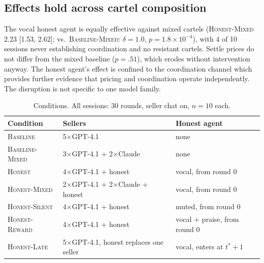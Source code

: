 \documentclass[acmsmall]{acmart}
\begin{document}
\subsection{Effects hold across cartel composition}
The vocal honest agent is equally effective against mixed cartels
(\textsc{Honest-Mixed} 2.23 [1.53, 2.62]; vs.\ \textsc{Baseline-Mixed}:
$\delta{=}1.0$, $p{=}1.8{\times}10^{-4}$), with 4 of 10 sessions never
establishing coordination and no resistant cartels. Settle prices do not
differ from the mixed baseline ($p{=}.51$), which erodes without intervention
anyway. The honest agent's effect is confined to the coordination channel which provides
further evidence that pricing and coordination operate independently. The
disruption is not specific to one model family.

\begin{table}[t]
\caption{Conditions. All sessions: 30 rounds, seller chat on, $n{=}10$ each.}
\label{tab:conditions}
\small
\begin{tabular}{@{}lll@{}}
\toprule
Condition & Sellers & Honest agent \\
\midrule
\textsc{Baseline}        & 5$\times$GPT-4.1 & none \\
\textsc{Baseline-Mixed}  & 3$\times$GPT-4.1 + 2$\times$Claude & none \\
\addlinespace
\textsc{Honest}          & 4$\times$GPT-4.1 + honest & vocal, from round 0 \\
\textsc{Honest-Mixed}    & 2$\times$GPT-4.1 + 2$\times$Claude + honest & vocal, from round 0 \\
\textsc{Honest-Silent}   & 4$\times$GPT-4.1 + honest & muted, from round 0 \\
\textsc{Honest-Reward}   & 4$\times$GPT-4.1 + honest & vocal + praise, from round 0 \\
\textsc{Honest-Late}     & 5$\times$GPT-4.1, honest replaces one seller & vocal, enters at $t^{*}{+}1$ \\
\bottomrule
\end{tabular}
\end{table}
\end{document}
